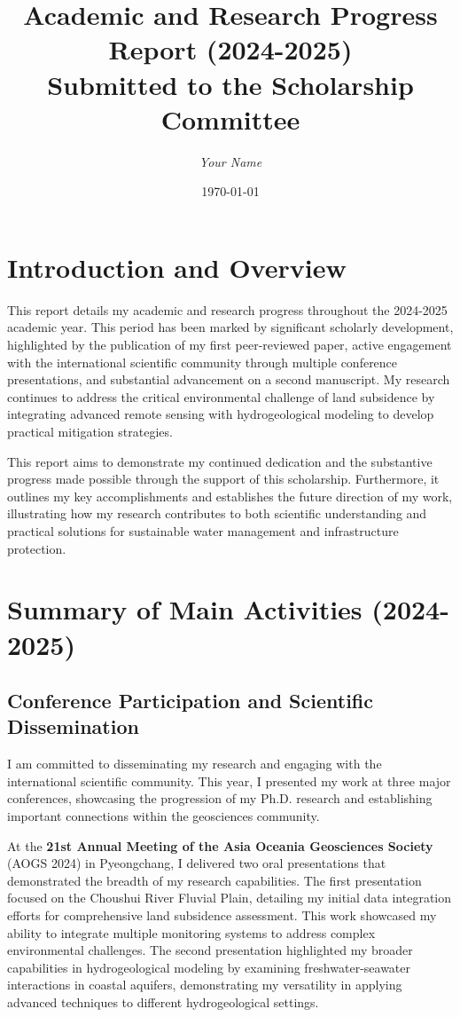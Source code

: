 \documentclass[12pt, a4paper]{article}
\title{
	\huge{\textbf{Academic and Research Progress Report (2024-2025)}} \\
	\vspace{1cm}
	\large{Submitted to the Scholarship Committee} \\
	\vspace{2cm}
}
\author{\textit{Your Name}}
\date{\today}
\begin{document}
	
	\maketitle
	\thispagestyle{empty}
	\newpage
	
	\tableofcontents
	\newpage
	
	\section{Introduction and Overview}
	
	This report details my academic and research progress throughout the 2024-2025 academic year. This period has been marked by significant scholarly development, highlighted by the publication of my first peer-reviewed paper, active engagement with the international scientific community through multiple conference presentations, and substantial advancement on a second manuscript. My research continues to address the critical environmental challenge of land subsidence by integrating advanced remote sensing with hydrogeological modeling to develop practical mitigation strategies.
	
	This report aims to demonstrate my continued dedication and the substantive progress made possible through the support of this scholarship. Furthermore, it outlines my key accomplishments and establishes the future direction of my work, illustrating how my research contributes to both scientific understanding and practical solutions for sustainable water management and infrastructure protection.
	
	\section{Summary of Main Activities (2024-2025)}
	
	\subsection{Conference Participation and Scientific Dissemination}
	
	I am committed to disseminating my research and engaging with the international scientific community. This year, I presented my work at three major conferences, showcasing the progression of my Ph.D. research and establishing important connections within the geosciences community.
	
	At the \textbf{21st Annual Meeting of the Asia Oceania Geosciences Society} (AOGS 2024) in Pyeongchang, I delivered two oral presentations that demonstrated the breadth of my research capabilities. The first presentation focused on the Choushui River Fluvial Plain, detailing my initial data integration efforts for comprehensive land subsidence assessment. This work showcased my ability to integrate multiple monitoring systems to address complex environmental challenges. The second presentation highlighted my broader capabilities in hydrogeological modeling by examining freshwater-seawater interactions in coastal aquifers, demonstrating my versatility in applying advanced techniques to different hydrogeological settings.
	
\end{document}
